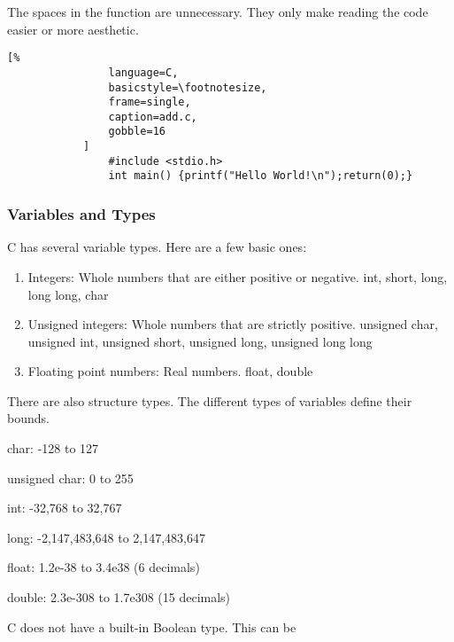 \documentclass[crop=false,class=article,oneside]{standalone}
\begin{document}
            \newline
            The spaces in the function are unnecessary.
            They only make reading the code easier or more aesthetic.
            \begin{lstlisting}[%
                language=C,
                basicstyle=\footnotesize,
                frame=single,
                caption=add.c,
                gobble=16
            ]
                #include <stdio.h>
                int main() {printf("Hello World!\n");return(0);}
            \end{lstlisting}
        \subsubsection{Variables and Types}
            C has several variable types. Here are a few basic ones:
            \begin{enumerate}
                \item Integers: Whole numbers that are either
                    positive or negative. int, short, long,
                    long long, char
                \item Unsigned integers: Whole numbers that are
                    strictly positive. unsigned char,
                    unsigned int, unsigned short, unsigned long,
                    unsigned long long
                \item Floating point numbers: Real numbers.
                    float, double
            \end{enumerate}
            There are also structure types. The different types of
            variables define their bounds.
            \begin{itemize}
                \begin{multicols}{2}
                    \item char: -128 to 127
                    \item unsigned char: 0 to 255
                    \item int: -32,768 to 32,767
                    \item long: -2,147,483,648 to 2,147,483,647
                    \item float: 1.2e-38 to 3.4e38 (6 decimals)
                    \item double: 2.3e-308 to 1.7e308 (15 decimals)
                \end{multicols}
            \end{itemize}
            C does not have a built-in Boolean type. This can be
\end{document}
